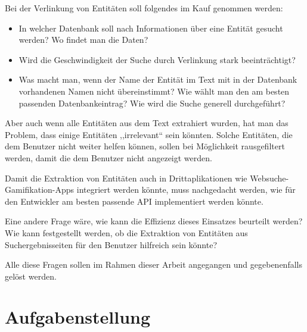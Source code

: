 Bei der Verlinkung von Entitäten soll folgendes im Kauf genommen werden:
\begin{itemize}
\item In welcher Datenbank soll nach Informationen über eine Entität gesucht werden? Wo findet man die Daten?
\item Wird die Geschwindigkeit der Suche durch Verlinkung stark beeinträchtigt?
\item Was macht man, wenn der Name der Entität im Text mit in der Datenbank vorhandenen Namen nicht übereinstimmt? Wie wählt man den am besten passenden Datenbankeintrag? Wie wird die Suche generell durchgeführt?
\end{itemize}

Aber auch wenn alle Entitäten aus dem Text extrahiert wurden, hat man das Problem, dass einige Entitäten ,,irrelevant`` sein könnten. Solche Entitäten, die dem Benutzer nicht weiter helfen können, sollen bei Möglichkeit rausgefiltert werden, damit die dem Benutzer nicht angezeigt werden. 

Damit die Extraktion von Entitäten auch in Drittaplikationen wie Websuche-Gamifikation-Apps\cite{Karatassis:15} integriert werden könnte, muss nachgedacht werden, wie für den Entwickler am besten passende API implementiert werden könnte.

Eine andere Frage wäre, wie kann die Effizienz dieses Einsatzes beurteilt werden? Wie kann festgestellt werden, ob die Extraktion von Entitäten aus Suchergebnisseiten für den Benutzer hilfreich sein könnte?

Alle diese Fragen sollen im Rahmen dieser Arbeit angegangen und gegebenenfalls gelöst werden.

\section{Aufgabenstellung}
\label{sec:Aufgabenstellung}
